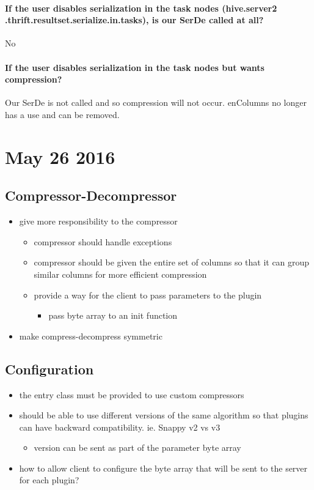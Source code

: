 \documentclass[11pt,a4paper]{article}
\begin{document}
	\paragraph{If the user disables serialization in the task nodes (hive.server2 .thrift.resultset.serialize.in.tasks), is our SerDe called at all?}
	No
	
	\paragraph{If the user disables serialization in the task nodes but wants compression?}
	Our SerDe is not called and so compression will not occur. enColumns no longer has a use and can be removed.
	
\section*{May 26 2016}
	
	\subsection*{Compressor-Decompressor}
	\begin{itemize}
		\item give more responsibility to the compressor
		\begin{itemize}
			\item compressor should handle exceptions
			\item compressor should be given the entire set of columns so that it can group similar columns for more efficient compression
			\item provide a way for the client to pass parameters to the plugin
			\begin{itemize}
				\item pass byte array to an init function
			\end{itemize}
		\end{itemize}
		\item make compress-decompress symmetric
	\end{itemize}
	
	\subsection*{Configuration}
	
	\begin{itemize}
		\item the entry class must be provided to use custom compressors
		\item should be able to use different versions of the same algorithm so that plugins can have backward compatibility. ie. Snappy v2 vs v3
		\begin{itemize}
			\item version can be sent as part of the parameter byte array
		\end{itemize}
		\item how to allow client to configure the byte array that will be sent to the server for each plugin?
	\end{itemize}
	
\end{document}
